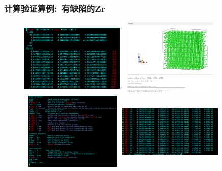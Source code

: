 \begin{frame}
	\frametitle{计算验证算例:~有缺陷的\textrm{Zr}}
\begin{figure}[h!]
\centering
\vskip -0.10in
\includegraphics[height=1.45in,width=1.95in,viewport=0 0 735 549,clip]{Figures/VASP_huge_USTB-Zr_POSCAR.png}
\includegraphics[height=1.45in,width=1.95in,viewport=0 0 1246 1053,clip]{Figures/VASP_huge_USTB-Zr_POSCAR-view.png}
\includegraphics[height=1.45in,width=1.95in,viewport=0 0 1100 900,clip]{Figures/VASP_huge_USTB-Zr_INCAR.png}
\includegraphics[height=1.45in,width=1.95in,viewport=0 0 990 685,clip]{Figures/VASP_huge_USTB-Zr_OSZICAR.png}
\label{VASP_Zr-POSCAR}
\end{figure} 
\end{frame}

